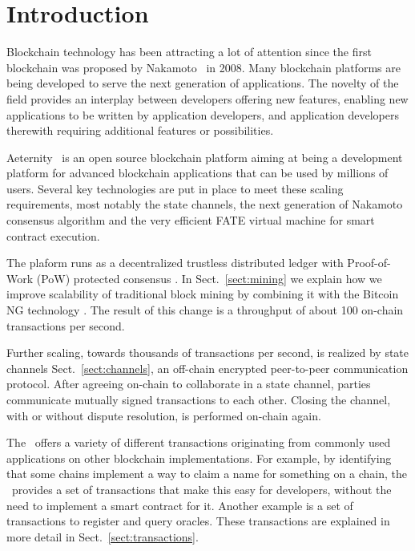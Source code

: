 \section{Introduction}

Blockchain technology has been attracting a lot of attention since the
first blockchain was proposed by Nakamoto~\cite{SN} in 2008.
Many blockchain platforms are being developed to serve the next
generation of applications. The novelty of the field provides an
interplay between developers offering new features, enabling new
applications to be written by application developers, and application
developers therewith requiring additional features or possibilities.

Aeternity~\cite{AE,UlfWigerCodeMesh2018} is an open source blockchain
platform aiming at being a development platform for
advanced blockchain applications that can be used by millions of
users. Several key technologies are put in place to meet these scaling
requirements, most notably the state channels, the next generation of
Nakamoto consensus algorithm and the very efficient FATE virtual
machine for smart contract execution.

The plaform runs as a decentralized trustless distributed
ledger with Proof-of-Work (PoW) protected consensus \cite{Tromp2015CuckooCA}.
In Sect.~\ref{sect:mining} we explain how we improve scalability of traditional
block mining by combining it with the Bitcoin NG technology
\cite{Eyal:2016:BSB:2930611.2930615}. The result of this change
is a throughput of about 100 on-chain transactions per second.

Further scaling, towards thousands of transactions per second, is
realized by state channels Sect.\ \ref{sect:channels}, an off-chain encrypted
peer-to-peer communication protocol. After agreeing on-chain to
collaborate in a state channel, parties communicate mutually signed
transactions to each other. Closing the channel, with or without
dispute resolution, is performed on-chain again.

The \blockchain\ offers a variety of different transactions originating from commonly
used applications on other blockchain implementations. For example, by
identifying that some chains implement a way to claim a name for
something on a chain, the \blockchain\ provides a set of
transactions that make this easy for developers, without the need to
implement a smart contract for it. Another example is a set of transactions to register and
query oracles. These transactions are explained in more detail in
Sect.\ \ref{sect:transactions}.


